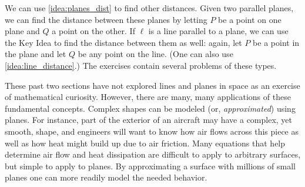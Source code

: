 We can use \autoref{idea:planes_dist} to find other distances. Given two parallel planes, we can find the distance between these planes by letting $P$ be a point on one plane and $Q$ a point on the other. If $\ell$ is a line parallel to a plane, we can use the Key Idea to find the distance between them as well: again, let $P$ be a point in the plane and let $Q$ be any point on the line. (One can also use \autoref{idea:line_distance}.) The exercises contain several problems of these types.

These past two sections have not explored lines and planes in space as an exercise of mathematical curiosity. However, there are many, many applications of these fundamental concepts. Complex shapes can be modeled (or, \textit{approximated}) using planes. For instance, part of the exterior of an aircraft may have a complex, yet smooth, shape, and engineers will want to know how air flows across this piece as well as how heat might build up due to air friction. Many equations that help determine air flow and heat dissipation are difficult to apply to arbitrary surfaces, but simple to apply to planes. By approximating a surface with millions of small planes one can more readily model the needed behavior.

